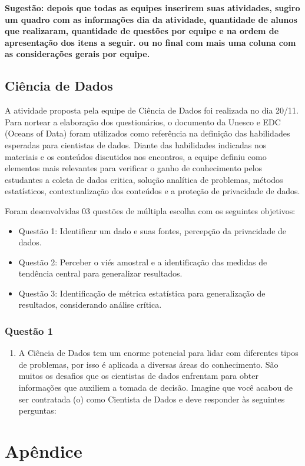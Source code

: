 \documentclass[
]{book}
\providecommand{\tightlist}{%
  \setlength{\itemsep}{0pt}\setlength{\parskip}{0pt}}
\begin{document}
\textbf{Sugestão: depois que todas as equipes inserirem suas atividades, sugiro um quadro com as informações dia da atividade, quantidade de alunos que realizaram, quantidade de questões por equipe e na ordem de apresentação dos itens a seguir. ou no final com mais uma coluna com as considerações gerais por equipe.}

\hypertarget{ciuxeancia-de-dados-1}{%
\section{Ciência de Dados}\label{ciuxeancia-de-dados-1}}

A atividade proposta pela equipe de Ciência de Dados foi realizada no dia 20/11. Para nortear a elaboração dos questionários, o documento da Unesco e EDC (Oceans of Data) foram utilizados como referência na definição das habilidades esperadas para cientistas de dados. Diante das habilidades indicadas nos materiais e os conteúdos discutidos nos encontros, a equipe definiu como elementos mais relevantes para verificar o ganho de conhecimento pelos estudantes a coleta de dados critica, solução analítica de problemas, métodos estatísticos, contextualização dos conteúdos e a proteção de privacidade de dados.

Foram desenvolvidas 03 questões de múltipla escolha com os seguintes objetivos:

\begin{itemize}
\tightlist
\item
  Questão 1: Identificar um dado e suas fontes, percepção da privacidade de dados.\\
\item
  Questão 2: Perceber o viés amostral e a identificação das medidas de tendência central para generalizar resultados.
\item
  Questão 3: Identificação de métrica estatística para generalização de resultados, considerando análise crítica.
\end{itemize}

\hypertarget{questuxe3o-1}{%
\subsection*{Questão 1}\label{questuxe3o-1}}

\begin{enumerate}
\def\labelenumi{\alph{enumi}.}
\tightlist
\item
  A Ciência de Dados tem um enorme potencial para lidar com diferentes tipos de problemas, por isso é aplicada a diversas áreas do conhecimento. São muitos os desafios que os cientistas de dados enfrentam para obter informações que auxiliem a tomada de decisão. Imagine que você acabou de ser contratada (o) como Cientista de Dados e deve responder às seguintes perguntas:
\end{enumerate}

\hypertarget{apuxeandice}{%
\chapter*{Apêndice}\label{apuxeandice}}

  
\end{document}
